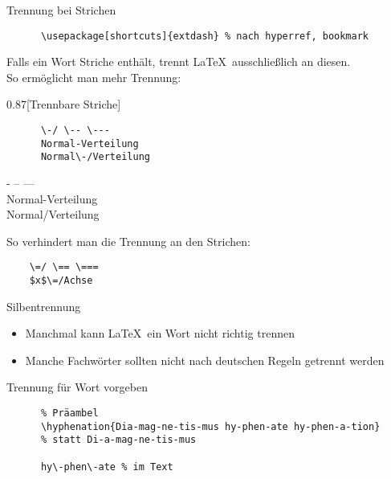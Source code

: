 \begin{frame}[fragile]{Trennung bei Strichen}
  \vspace*{-2em}
  \begin{Packages}
    \begin{verbatim}
      \usepackage[shortcuts]{extdash} % nach hyperref, bookmark
    \end{verbatim}
  \end{Packages}

  Falls ein Wort Striche enthält, trennt \LaTeX\ ausschließlich an diesen.\\
  So ermöglicht man mehr Trennung:
  \vspace{-0.5em}
  \begin{CodeExample}{0.87}[Trennbare Striche]
    \begin{verbatim}
      \-/ \-- \---
      Normal-Verteilung
      Normal\-/Verteilung
    \end{verbatim}
  \CodeResult
    \strut
    - -- --- \\
    Normal-Verteilung \\
    Normal\-/Verteilung
  \end{CodeExample}

  So verhindert man die Trennung an den Strichen:
  \begin{verbatim}
    \=/ \== \===
    $x$\=/Achse
  \end{verbatim}
\end{frame}

\begin{frame}[fragile]{Silbentrennung}
  \begin{itemize}
    \item Manchmal kann \LaTeX\ ein Wort nicht richtig trennen
    \item Manche Fachwörter sollten nicht nach deutschen Regeln getrennt werden
  \end{itemize}
  \begin{block}{Trennung für Wort vorgeben}
    \begin{verbatim}
      % Präambel
      \hyphenation{Dia-mag-ne-tis-mus hy-phen-ate hy-phen-a-tion}
      % statt Di-a-mag-ne-tis-mus

      hy\-phen\-ate % im Text
    \end{verbatim}
  \end{block}
\end{frame}
